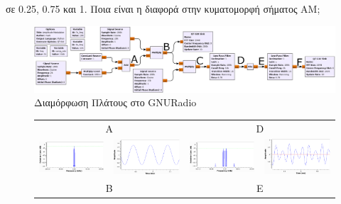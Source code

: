 \documentclass[12pt]{report}
\begin{document}
            σε 0.25, 0.75 και 1. Ποια είναι η διαφορά στην κυματομορφή σήματος AM;
            \begin{figure}[h]
                \centering
                \includegraphics[width=\textwidth]{ex1Flow.png}
                \caption{Διαμόρφωση Πλάτους στο GNURadio}
                \label{img:ex1Flow}
            \end{figure}

            \begin{figure}[h]
                \centering
                \begin{tabular}{cccc}
                    \multicolumn{2}{c}{A} & \multicolumn{2}{c}{D} \\
                    \includegraphics[width=.23\linewidth]{ex1Af.png} & \includegraphics[width=.23\linewidth]{ex1At.png} & \includegraphics[width=.23\linewidth]{ex1Df.png} & \includegraphics[width=.23\linewidth]{ex1Dt.png}\\
                    \multicolumn{2}{c}{B} & \multicolumn{2}{c}{E} \\

\end{tabular}
\end{figure}
\end{document}
